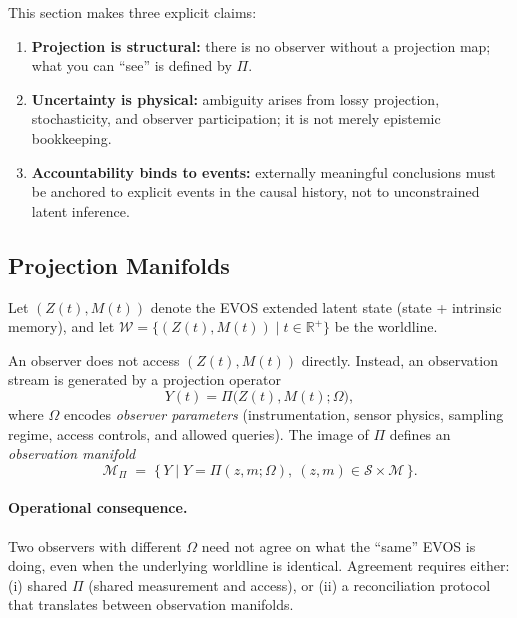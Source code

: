 \documentclass[11pt]{article}
\begin{document}
This section makes three explicit claims:

\begin{enumerate}
  \item \textbf{Projection is structural:} there is no observer without a projection map; what you can
  ``see'' is defined by $\Pi$.
  \item \textbf{Uncertainty is physical:} ambiguity arises from lossy projection, stochasticity, and
  observer participation; it is not merely epistemic bookkeeping.
  \item \textbf{Accountability binds to events:} externally meaningful conclusions must be anchored to
  explicit events in the causal history, not to unconstrained latent inference.
\end{enumerate}

\subsection{Projection Manifolds}
\label{sec:projection-manifold}

Let $(Z(t), M(t))$ denote the EVOS extended latent state (state + intrinsic memory), and let
$\mathcal{W}=\{(Z(t),M(t))\mid t\in\mathbb{R}^+\}$ be the worldline.

An observer does not access $(Z(t),M(t))$ directly. Instead, an observation stream is generated by a
projection operator
\[
Y(t) = \Pi\big(Z(t), M(t); \Omega\big),
\]
where $\Omega$ encodes \emph{observer parameters} (instrumentation, sensor physics, sampling regime,
access controls, and allowed queries). The image of $\Pi$ defines an \emph{observation manifold}
\[
\mathcal{M}_{\Pi} \;=\; \{\, Y \mid Y=\Pi(z,m;\Omega),\ (z,m)\in\mathcal{S}\times\mathcal{M} \,\}.
\]

\paragraph{Operational consequence.}
Two observers with different $\Omega$ need not agree on what the ``same'' EVOS is doing, even when
the underlying worldline is identical. Agreement requires either:
(i) shared $\Pi$ (shared measurement and access), or
(ii) a reconciliation protocol that translates between observation manifolds.
\end{document}
